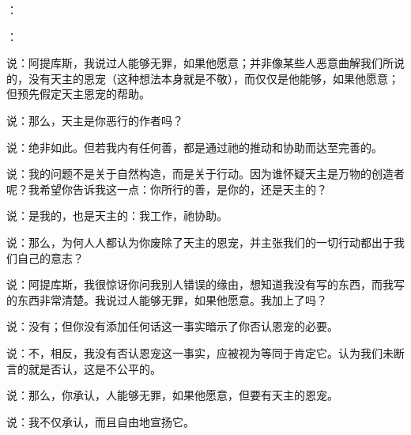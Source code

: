 ：\newline{}\par

：\newline{}\par

说：阿提库斯，我说过人能够无罪，如果他愿意；并非像某些人恶意曲解我们所说的，没有天主的恩宠（这种想法本身就是不敬），而仅仅是他能够，如果他愿意；但预先假定天主恩宠的帮助。\par

说：那么，天主是你恶行的作者吗？\par

说：绝非如此。但若我内有任何善，都是通过祂的推动和协助而达至完善的。\par

说：我的问题不是关于自然构造，而是关于行动。因为谁怀疑天主是万物的创造者呢？我希望你告诉我这一点：你所行的善，是你的，还是天主的？\par

说：是我的，也是天主的：我工作，祂协助。\par

说：那么，为何人人都认为你废除了天主的恩宠，并主张我们的一切行动都出于我们自己的意志？\par

说：阿提库斯，我很惊讶你问我别人错误的缘由，想知道我没有写的东西，而我写的东西非常清楚。我说过人能够无罪，如果他愿意。我加上了吗？\par

说：没有；但你没有添加任何话这一事实暗示了你否认恩宠的必要。\par

说：不，相反，我没有否认恩宠这一事实，应被视为等同于肯定它。认为我们未断言的就是否认，这是不公平的。\par

说：那么，你承认，人能够无罪，如果他愿意，但要有天主的恩宠。\par

说：我不仅承认，而且自由地宣扬它。\par

